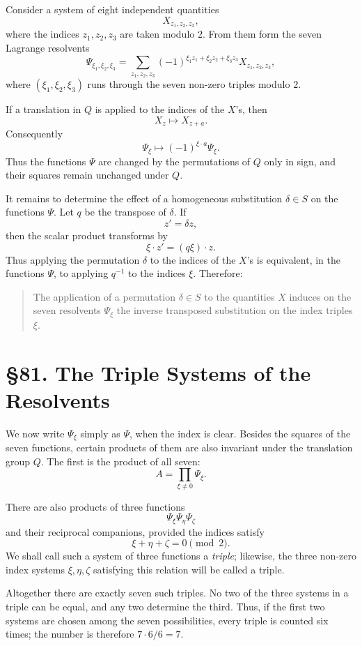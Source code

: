 \documentclass[11pt,a4paper]{book}
\newcommand{\webersection}[2]{\clearpage\section*{\S #1. #2}}
\begin{document}
Consider a system of eight independent quantities
\[
 X_{z_1,z_2,z_3},
\]
where the indices \(z_1,z_2,z_3\) are taken modulo \(2\).  From them form the seven Lagrange resolvents
\[
 \Psi_{\xi_1,\xi_2,\xi_3}
   =\sum_{z_1,z_2,z_3}
     (-1)^{\xi_1z_1+\xi_2z_2+\xi_3z_3}
       X_{z_1,z_2,z_3},
\]
where \((\xi_1,\xi_2,\xi_3)\) runs through the seven non-zero triples modulo \(2\).

If a translation in \(Q\) is applied to the indices of the \(X\)'s, then
\[
 X_z\longmapsto X_{z+a}.
\]
Consequently
\[
 \Psi_\xi\longmapsto
 (-1)^{\xi\cdot a}\Psi_\xi .
\]
Thus the functions \(\Psi\) are changed by the permutations of \(Q\) only in sign, and their squares remain unchanged under \(Q\).

It remains to determine the effect of a homogeneous substitution \(\delta\in S\) on the functions \(\Psi\).  Let \(q\) be the transpose of \(\delta\).  If
\[
 z'=\delta z,
\]
then the scalar product transforms by
\[
 \xi\cdot z'=(q\xi)\cdot z.
\]
Thus applying the permutation \(\delta\) to the indices of the \(X\)'s is equivalent, in the functions \(\Psi\), to applying \(q^{-1}\) to the indices \(\xi\).  Therefore:

\begin{quote}
The application of a permutation \(\delta\in S\) to the quantities \(X\) induces on the seven resolvents \(\Psi_\xi\) the inverse transposed substitution on the index triples \(\xi\).
\end{quote}

\webersection{81}{The Triple Systems of the Resolvents}

We now write \(\Psi_\xi\) simply as \(\Psi\), when the index is clear.  Besides the squares of the seven functions, certain products of them are also invariant under the translation group \(Q\).  The first is the product of all seven:
\[
 A=\prod_{\xi\ne0}\Psi_\xi .
\]

There are also products of three functions
\[
 \Psi_\xi\Psi_\eta\Psi_\zeta
\]
and their reciprocal companions, provided the indices satisfy
\[
 \xi+\eta+\zeta=0\pmod2 .
\]
We shall call such a system of three functions a \emph{triple}; likewise, the three non-zero index systems \(\xi,\eta,\zeta\) satisfying this relation will be called a triple.

Altogether there are exactly seven such triples.  No two of the three systems in a triple can be equal, and any two determine the third.  Thus, if the first two systems are chosen among the seven possibilities, every triple is counted six times; the number is therefore \(7\cdot6/6=7\).
\end{document}
